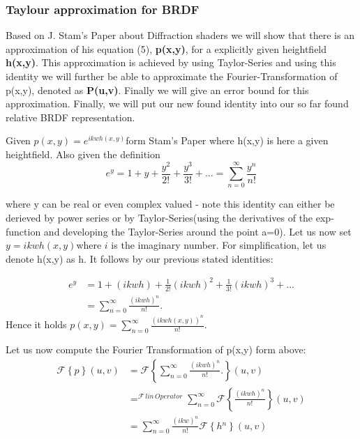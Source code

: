 \subsubsection{Taylour approximation for BRDF}
Based on J. Stam's Paper about Diffraction shaders we will show that
there is an approximation of his equation (5), \textbf{p(x,y)}, for
a explicitly given heightfield \textbf{h(x,y)}. This approximation
is achieved by using Taylor-Series and using this identity we will
further be able to approximate the Fourier-Transformation of p(x,y),
denoted as \textbf{P(u,v)}. Finally we will give an error bound for
this approximation. Finally, we will put our new found identity into our so far found relative BRDF representation.

Given $p(x,y)=e^{ikwh(x,y)}$form Stam's Paper where h(x,y) is here
a given heightfield. Also given the definition
\begin{equation*}
  e^{y}=1+y+\frac{y^{2}}{2!}+\frac{y^{3}}{3!}+...=\sum_{n=0}^{\infty}\frac{y^{n}}{n!}
\end{equation*}

where y can be real or even complex valued - note this identity can either
be derieved by power series or by Taylor-Series(using the derivatives
of the exp-function and developing the Taylor-Series around the point
a=0). Let us now set $y=ikwh(x,y)$where $i$ is the imaginary number.
For simplification, let us denote h(x,y) as h. It follows by our previous
stated identities: 

\begin{align*}
 e^{y}
 &=1+(ikwh)+\frac{1}{2!}(ikwh)^{2}+\frac{1}{3!}(ikwh)^{3}+... \\
 &=\sum_{n=0}^{\infty}\frac{(ikwh)^{n}}{n!}.
\end{align*}
Hence it holds $p(x,y)=\sum_{n=0}^{\infty}\frac{(ikwh(x,y))^{n}}{n!}.$

Let us now compute the Fourier Transformation of p(x,y) form above:
\begin{align*}
  \mathcal{F}\left\{ p\right\} (u,v)
  & =\mathcal{F}\left\{ \sum_{n=0}^{\infty}\frac{(ikwh)^{n}}{n!}.\right\}(u,v) \\
  & =^{\mathcal{F}\, lin\, Operator}\sum_{n=0}^{\infty}\mathcal{F}\left\{ \frac{(ikwh)^{n}}{n!}\right\}(u,v) \\
  & =\sum_{n=0}^{\infty}\frac{(ikw)^{n}}{n!}\mathcal{F}\left\{ h{}^{n}\right\}(u,v)
\end{align*}

